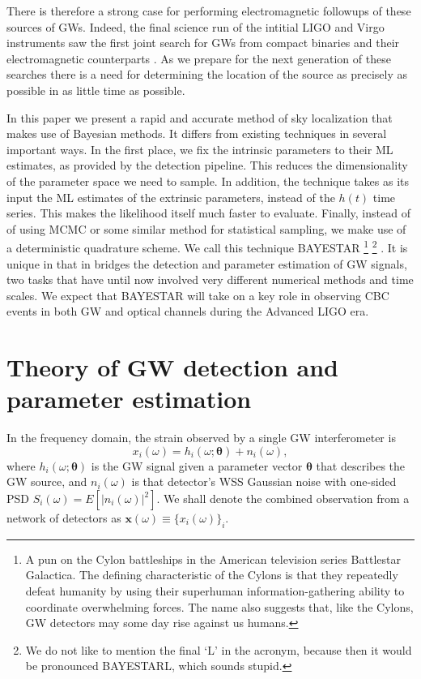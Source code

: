 \documentclass{iopart}
\begin{document}
There is therefore a strong case for performing electromagnetic followups of these sources of \acp{GW}. Indeed, the final science run of the intitial LIGO and Virgo instruments saw the first joint search for \acp{GW} from compact binaries and their electromagnetic counterparts \cite{abadie2012first}.  As we prepare for the next generation of these searches there is a need for determining the location of the source as precisely as possible in as little time as possible.

In this paper we present a rapid and accurate method of sky localization that makes use of Bayesian methods. It differs from existing techniques in several important ways.  In the first place, we fix the intrinsic parameters to their \ac{ML} estimates, as provided by the detection pipeline.  This reduces the dimensionality of the parameter space we need to sample. In addition, the technique takes as its input the \ac{ML} estimates of the extrinsic parameters, instead of the $h(t)$ time series. This makes the likelihood itself much faster to evaluate. Finally, instead of of using \ac{MCMC} or some similar method for statistical sampling, we make use of a deterministic quadrature scheme. We call this technique \ac{BAYESTAR}%
%
\footnote{A pun on the Cylon battleships in the American television series Battlestar Galactica. The defining characteristic of the Cylons is that they repeatedly defeat humanity by using their superhuman information\nobreakdashes-gathering ability to coordinate overwhelming forces. The name also suggests that, like the Cylons, \ac{GW} detectors may some day rise against us humans.}%
%
\footnote{We do not like to mention the final `L' in the acronym, because then it would be pronounced BAYESTARL, which sounds stupid.}%
. It is unique in that in bridges the detection and parameter estimation of \ac{GW} signals, two tasks that have until now involved very different numerical methods and time scales. We expect that \ac{BAYESTAR} will take on a key role in observing \ac{CBC} events in both \ac{GW} and optical channels during the Advanced \ac{LIGO} era.

\section{Theory of \ac{GW} detection and parameter estimation}

In the frequency domain, the strain observed by a single \ac{GW} interferometer is
%
\begin{equation}\label{eq:signal-model}
	x_i (\omega) = h_i (\omega; \boldsymbol\theta) + n_i (\omega),
\end{equation}
%
where $h_i (\omega; \boldsymbol\theta)$ is the \ac{GW} signal given a parameter vector $\boldsymbol\theta$ that describes the \ac{GW} source, and $n_i (\omega)$ is that detector's \ac{WSS} Gaussian noise with one\nobreakdashes-sided \ac{PSD} $S_i(\omega) = E\left[\left|n_i(\omega)\right|^2\right]$. We shall denote the combined observation from a network of detectors as $\mathbf x (\omega) \equiv \{x_i (\omega)\}_i$.
\end{document}
